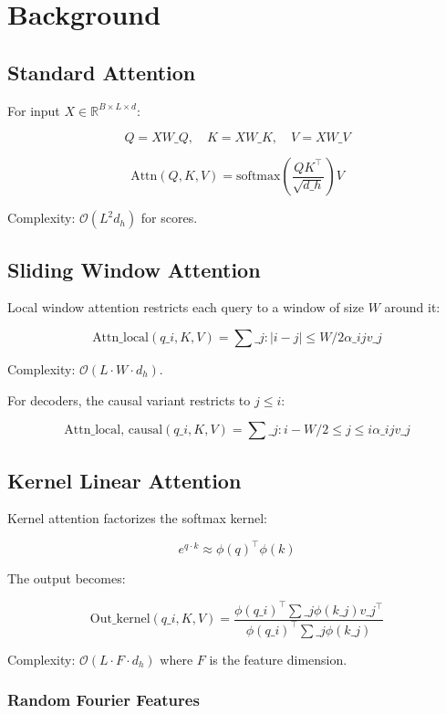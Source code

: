 \section{Background}

\subsection{Standard Attention}

For input $X \in \mathbb{R}^{B \times L \times d}$:

\[
Q = X W\_Q, \quad K = X W\_K, \quad V = X W\_V
\]

\[
\text{Attn}(Q, K, V) = \text{softmax}\!\left(\frac{Q K^\top}{\sqrt{d\_h}}\right) V
\]

Complexity: $\mathcal{O}(L^2 d_h)$ for scores.

\subsection{Sliding Window Attention}

Local window attention restricts each query to a window of size $W$ around 
it:

\[
\text{Attn}\_\text{local}(q\_i, K, V) = \sum\_{j : |i - j| \leq W/2} \alpha\_{ij} v\_j
\]

Complexity: $\mathcal{O}(L \cdot W \cdot d_h)$.

For decoders, the causal variant restricts to $j \leq i$:

\[
\text{Attn}\_\text{local, causal}(q\_i, K, V) = \sum\_{j : i - W/2 \leq j \leq i} \alpha\_{ij} v\_j
\]

\subsection{Kernel Linear Attention}

Kernel attention factorizes the softmax kernel:

\[
e^{q \cdot k} \approx \phi(q)^\top \phi(k)
\]

The output becomes:

\[
\text{Out}\_\text{kernel}(q\_i, K, V) = \frac{\phi(q\_i)^\top \sum\_j \phi(k\_j) v\_j^\top}{\phi(q\_i)^\top \sum\_j \phi(k\_j)}
\]

Complexity: $\mathcal{O}(L \cdot F \cdot d_h)$ where $F$ is the feature 
dimension.

\subsubsection{Random Fourier Features}

